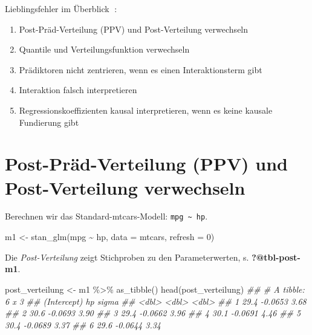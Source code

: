 \documentclass[
  a4paper,
  DIV=11]{scrreprt}
\newenvironment{Shaded}{\begin{snugshade}}{\end{snugshade}}
\newcommand{\AttributeTok}[1]{\textcolor[rgb]{0.40,0.45,0.13}{#1}}
\newcommand{\DecValTok}[1]{\textcolor[rgb]{0.68,0.00,0.00}{#1}}
\newcommand{\DocumentationTok}[1]{\textcolor[rgb]{0.37,0.37,0.37}{\textit{#1}}}
\newcommand{\FunctionTok}[1]{\textcolor[rgb]{0.28,0.35,0.67}{#1}}
\newcommand{\NormalTok}[1]{\textcolor[rgb]{0.00,0.23,0.31}{#1}}
\newcommand{\OtherTok}[1]{\textcolor[rgb]{0.00,0.23,0.31}{#1}}
\newcommand{\SpecialCharTok}[1]{\textcolor[rgb]{0.37,0.37,0.37}{#1}}
\providecommand{\tightlist}{%
  \setlength{\itemsep}{0pt}\setlength{\parskip}{0pt}}\usepackage{longtable,booktabs,array}
\theoremstyle{definition}
\theoremstyle{remark}
\begin{document}
Lieblingsfehler im Überblick 🤷:

\begin{enumerate}
\def\labelenumi{\arabic{enumi}.}
\tightlist
\item
  Post-Präd-Verteilung (PPV) und Post-Verteilung verwechseln
\item
  Quantile und Verteilungsfunktion verwechseln
\item
  Prädiktoren nicht zentrieren, wenn es einen Interaktionsterm gibt
\item
  Interaktion falsch interpretieren
\item
  Regressionskoeffizienten kausal interpretieren, wenn es keine kausale
  Fundierung gibt
\end{enumerate}

\hypertarget{post-pruxe4d-verteilung-ppv-und-post-verteilung-verwechseln}{%
\section{Post-Präd-Verteilung (PPV) und Post-Verteilung verwechseln
🤷}\label{post-pruxe4d-verteilung-ppv-und-post-verteilung-verwechseln}}

Berechnen wir das Standard-mtcars-Modell:
\texttt{mpg\ \textasciitilde{}\ hp}.

\begin{Shaded}
\begin{Highlighting}[]
\NormalTok{m1 }\OtherTok{\textless{}{-}} \FunctionTok{stan\_glm}\NormalTok{(mpg }\SpecialCharTok{\textasciitilde{}}\NormalTok{ hp, }\AttributeTok{data =}\NormalTok{ mtcars, }\AttributeTok{refresh =} \DecValTok{0}\NormalTok{)}
\end{Highlighting}
\end{Shaded}

Die \emph{Post-Verteilung} zeigt Stichproben zu den Parameterwerten, s.
\textbf{?@tbl-post-m1}.

\begin{Shaded}
\begin{Highlighting}[]
\NormalTok{post\_verteilung }\OtherTok{\textless{}{-}}\NormalTok{ m1 }\SpecialCharTok{\%\textgreater{}\%} 
  \FunctionTok{as\_tibble}\NormalTok{()}
\FunctionTok{head}\NormalTok{(post\_verteilung)}
\DocumentationTok{\#\# \# A tibble: 6 x 3}
\DocumentationTok{\#\#   \textasciigrave{}(Intercept)\textasciigrave{}      hp sigma}
\DocumentationTok{\#\#           \textless{}dbl\textgreater{}   \textless{}dbl\textgreater{} \textless{}dbl\textgreater{}}
\DocumentationTok{\#\# 1          29.4 {-}0.0653  3.68}
\DocumentationTok{\#\# 2          30.6 {-}0.0693  3.90}
\DocumentationTok{\#\# 3          29.4 {-}0.0662  3.96}
\DocumentationTok{\#\# 4          30.1 {-}0.0691  4.46}
\DocumentationTok{\#\# 5          30.4 {-}0.0689  3.37}
\DocumentationTok{\#\# 6          29.6 {-}0.0644  3.34}
\end{Highlighting}
\end{Shaded}
\end{document}
